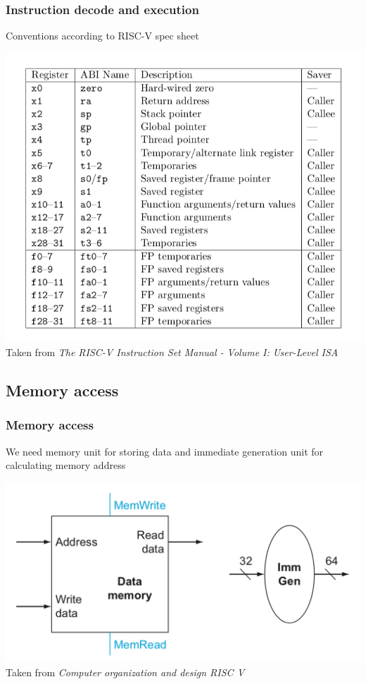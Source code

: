 \documentclass{beamer}
\begin{document}
    \begin{frame}
        \frametitle{Instruction decode and execution}
        \centering
        \vspace{-0.5cm}
        Conventions according to RISC-V spec sheet
        
        \includegraphics[scale=0.5]{"Pictures and plots/registercon"} \\
        \scriptsize{Taken from \textit{The RISC-V Instruction Set Manual - Volume I: User-Level ISA}}
        
    \end{frame}

    \begin{frame}
        \subsection{Memory access}
        \frametitle{Memory access}
        \centering
        \vspace{-0.5cm}
        We need memory unit for storing data and immediate generation unit for calculating memory address
        
        \includegraphics[scale=0.4]{"Pictures and plots/MEMACC"} \\
        \scriptsize{Taken from \textit{Computer organization and design RISC V}}
        
    \end{frame}
\end{document}

